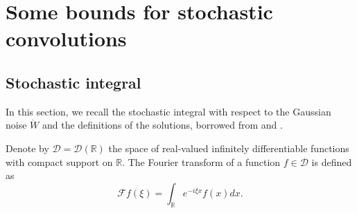 \documentclass[11pt,reqno]{amsart}
\numberwithin{equation}{section}
\newcommand{\1}{{\bf 1}}
\newcommand{\2}{{\bf 2}}
\begin{document}
\section{Some bounds for stochastic convolutions}\label{sec-3}
   
 
\subsection{Stochastic integral}

 In this section, we   recall the stochastic integral with respect to the Gaussian noise $\dot W$ and the definitions of the solutions, borrowed from \cite{HHLNT2017} and \cite{HW2022}.
  
 Denote by  $ \mathcal{D}=\mathcal{D}(\mathbb{R}) $  the space of   {real-valued infinitely differentiable} functions with compact support on $\mathbb{R}$. %
 The Fourier transform of a function $f\in\mathcal{D}$ is defined as
 $$
   \mathscr {F} f(\xi)=\int_{\mathbb{R}} e^{-i\xi x}f(x) dx.
$$
\end{document}
